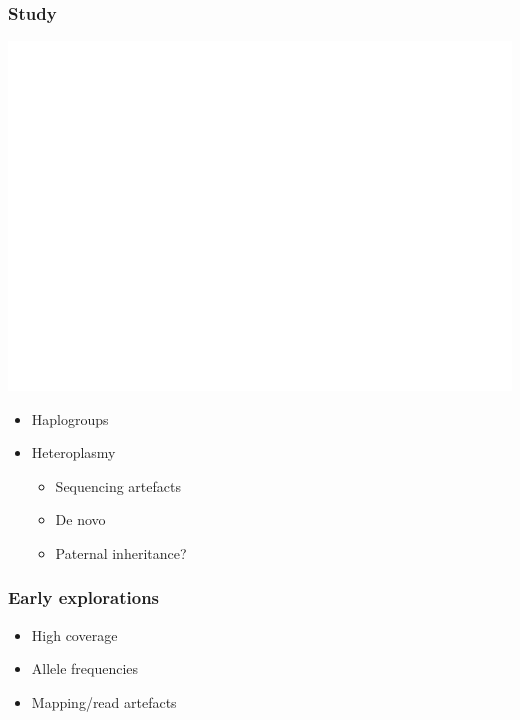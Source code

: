 \documentclass[slidestop,14pt]{beamer}
\begin{document}
\begin{frame}
  \frametitle{Study}

  \vspace{-2.2\baselineskip}

  \begin{center}
    \includegraphics[width=0.9\linewidth,transparent]{mthaplogroups.png}
  \end{center}

  \vspace{-4\baselineskip}

  \begin{itemize}
    \item Haplogroups
    \item Heteroplasmy
      \begin{itemize}
        \item Sequencing artefacts
        \item De novo
        \item Paternal inheritance?
      \end{itemize}
  \end{itemize}
\end{frame}

\begin{frame}
  \frametitle{Early explorations}

  \vspace{\baselineskip}

  \begin{itemize}
    \item High coverage
    \item Allele frequencies
    \item Mapping/read artefacts
  \end{itemize}
\end{frame}
\end{document}
